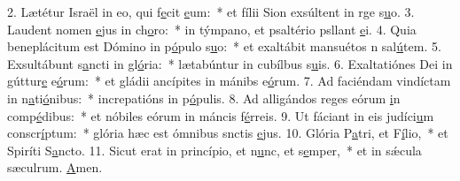 2. Lætétur Israël in eo, qui f\uline{e}cit \uline{e}um:~* et fílii Sion exsúltent in rge s\uline{u}o.
3. Laudent nomen \uline{e}jus in ch\uline{o}ro:~* in týmpano, et psaltério psllant \uline{e}i.
4. Quia beneplácitum est Dómino in p\uline{ó}pulo s\uline{u}o:~* et exaltábit mansuétos n sal\uline{ú}tem.
5. Exsultábunt s\uline{a}ncti in gl\uline{ó}ria:~* lætabúntur in cubílbus s\uline{u}is.
6. Exaltatiónes Dei in gúttur\uline{e} e\uline{ó}rum:~* et gládii ancípites in mánibs e\uline{ó}rum.
7. Ad faciéndam vindíctam in n\uline{a}ti\uline{ó}nibus:~* increpatións in p\uline{ó}pulis.
8. Ad alligándos reges eórum \uline{i}n comp\uline{é}dibus:~* et nóbiles eórum in máncis f\uline{é}rreis.
9. Ut fáciant in eis judíci\uline{u}m conscr\uline{í}ptum:~* glória hæc est ómnibus snctis \uline{e}jus.
10. Glória P\uline{a}tri, et F\uline{í}lio,~* et Spiríti S\uline{a}ncto.
11. Sicut erat in princípio, et n\uline{u}nc, et s\uline{e}mper,~* et in sǽcula sæculrum. \uline{A}men.

